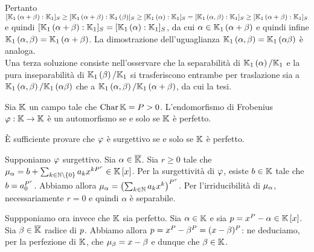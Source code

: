 \par Pertanto $[\mathbb{K}_1 \left ( \alpha + \beta \right ):\mathbb{K}_1]_S \geq [\mathbb{K}_1 \left ( \alpha + \beta \right ):\mathbb{K}_1 \left ( \beta \right )]_S \geq [\mathbb{K}_1 \left ( \alpha \right ):\mathbb{K}_1]_S = [\mathbb{K}_1 \left ( \alpha, \beta \right ):\mathbb{K}_1]_S \geq [\mathbb{K}_1 \left ( \alpha + \beta \right ):\mathbb{K}_1]_S$ e quindi $[\mathbb{K}_1 \left ( \alpha + \beta \right ):\mathbb{K}_1]_S = [\mathbb{K}_1 \left ( \alpha \right ):\mathbb{K}_1]_S$, da cui $\alpha \in \mathbb{K}_1 \left ( \alpha + \beta \right )$ e quindi infine $\mathbb{K}_1 \left ( \alpha, \beta \right ) = \mathbb{K}_1 \left ( \alpha + \beta \right )$. La dimostrazione dell'uguaglianza $\mathbb{K}_1 \left ( \alpha, \beta \right ) = \mathbb{K}_1 \left ( \alpha\beta \right )$ \`e analoga. \EndProof
\\\Proof Una terza soluzione consiste nell'osservare che la separabilit\`a di $\mathbb{K}_1 \left ( \alpha \right )/\mathbb{K}_1$ e la pura inseparabilit\`a di $\mathbb{K}_1 \left ( \beta \right )/\mathbb{K}_1$ si trasferiscono entrambe per traslazione sia a $\mathbb{K}_1 \left ( \alpha,\beta \right )/\mathbb{K}_1 \left ( \alpha\beta \right )$ che a $\mathbb{K}_1 \left ( \alpha,\beta \right )/\mathbb{K}_1 \left ( \alpha + \beta \right )$, da cui la tesi. \EndSolution
\begin{Theorem}
	Sia $\mathbb{K}$ un campo tale che $\operatorname{Char}{\mathbb{K}} = P > 0$. L'endomorfismo di Frobenius $\varphi: \mathbb{K} \rightarrow \mathbb{K}$ \`e un automorfismo se e solo se $\mathbb{K}$ \`e perfetto.
\end{Theorem}
\Proof \`E sufficiente provare che $\varphi$ \`e surgettivo se e solo se $\mathbb{K}$ \`e perfetto.
\par Supponiamo $\varphi$ surgettivo. Sia $\alpha \in \overline{\mathbb{K}}$. Sia $r \geq 0$ tale che $\MinimalPolynomial{\alpha} = b + \sum_{k \in \NotZero{\mathbb{N}}} a_k x^{k{\Prime^r}} \in \RingAdjunction{\Field}{x}$. Per la surgettivit\`a di $\varphi$, esiste $b \in \mathbb{K}$ tale che $b = a_0^{P^r}$. Abbiamo allora $\MinimalPolynomial{\alpha} = \left ( \sum_{k \in \mathbb{N}} a_k x^k \right )^{\Prime^r}$. Per l'irriducibilit\`a di $\MinimalPolynomial{\alpha}$, necessariamente $r = 0$ e quindi $\alpha$ \`e separabile.
\par Suppponiamo ora invece che $\mathbb{K}$ sia perfetto. Sia $\alpha \in \mathbb{K}$ e sia $p = x^P - \alpha \in \mathbb{K} \left [ x \right ]$. Sia $\beta \in \overline{\mathbb{K}}$ radice di $p$. Abbiamo allora $p = x^P - \beta^P = (x - \beta)^P$: ne deduciamo, per la perfezione di $\mathbb{K}$, che $\MinimalPolynomial{\beta} = x - \beta$ e dunque che $\beta \in \mathbb{K}$. \EndProof
